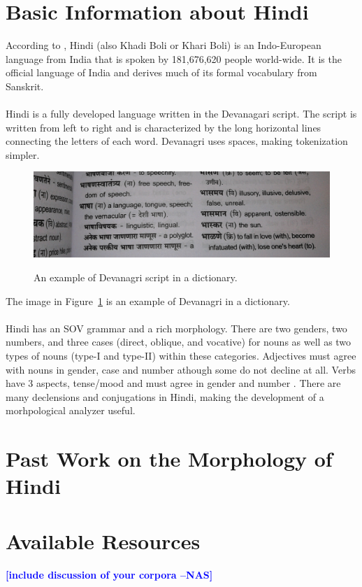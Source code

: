 \documentclass[11pt,letterpaper]{article}
\newcommand{\nascomment}[1]{\textcolor{blue}{\textbf{[#1 --NAS]}}}
\begin{document}
\section{Basic Information about Hindi}
According to \cite{ethnologue}, Hindi (also Khadi Boli or Khari Boli) is an Indo-European language from India that is spoken by 181,676,620 people world-wide. It is the official language of India and derives much of its formal vocabulary from Sanskrit. \\
\\
Hindi is a fully developed language written in the Devanagari script. The script is written from left to right and is characterized by the long horizontal lines connecting the letters of each word. Devanagri uses spaces, making tokenization simpler.
\begin{figure}[h]
  \caption{An example of Devanagri script in a dictionary.}
  \centering
  \includegraphics[scale=0.15]{devanagri.jpg}
  \label{script}
\end{figure}
The image in Figure~\ref{script} is an example of Devanagri in a dictionary. \\
\\
Hindi has an SOV grammar and a rich morphology. There are two genders, two numbers, and three cases (direct, oblique, and vocative) for nouns as well as two types of nouns (type-I and type-II) within these categories. Adjectives must agree with nouns in gender, case and number athough some do not decline at all. Verbs have 3 aspects, tense/mood and must agree in gender and number \cite{snell}. There are many declensions and conjugations in Hindi, making the development of a morhpological analyzer useful.
\section{Past Work on the Morphology of Hindi}

\section{Available Resources}

\nascomment{include discussion of your corpora}
\end{document}
